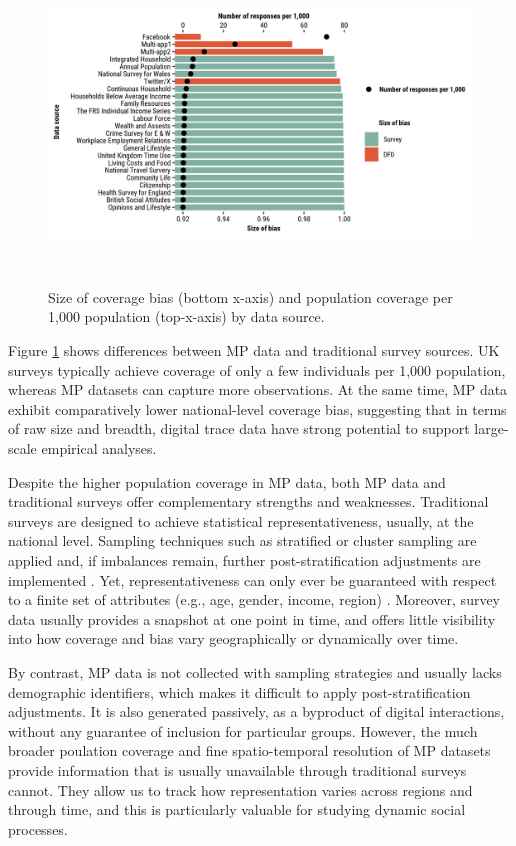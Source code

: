 \documentclass[]{rsos}%
\begin{document}
\begin{figure}
\centering
\includegraphics[width=14cm,height=8.5cm]{figures/compare-surveys-two-axis.png}
\caption{Size of coverage bias (bottom x-axis) and population coverage per
1,000 population (top-x-axis) by data
source.}\label{fig:survey}
\end{figure}

Figure \ref{fig:survey} shows differences between MP data and
traditional survey sources. UK surveys typically achieve coverage of
only a few individuals per 1,000 population, whereas MP datasets can
capture more observations. At the same time, MP data exhibit
comparatively lower national-level coverage bias, suggesting that in
terms of raw size and breadth, digital trace data have strong potential
to support large-scale empirical analyses.

Despite the higher population coverage in MP data, both MP data and
traditional surveys offer complementary strengths and weaknesses.
Traditional surveys are designed to achieve statistical
representativeness, usually, at the national level. Sampling techniques
such as stratified or cluster sampling are applied and, if imbalances
remain, further post-stratification adjustments are implemented
\citep{lohr2021}. Yet, representativeness can only ever be guaranteed with
respect to a finite set of attributes (e.g., age, gender, income,
region) \citep{cochran1977sampling}. Moreover, survey data usually provides a
snapshot at one point in time, and offers little visibility into how
coverage and bias vary geographically or dynamically over time.

By contrast, MP data is not collected with sampling strategies and
usually lacks demographic identifiers, which makes it difficult to apply
post-stratification adjustments. It is also generated passively, as a
byproduct of digital interactions, without any guarantee of inclusion
for particular groups. However, the much broader poulation coverage and
fine spatio-temporal resolution of MP datasets provide information that
is usually unavailable through traditional surveys cannot. They allow us
to track how representation varies across regions and through time, and
this is particularly valuable for studying dynamic social processes.
\end{document}
